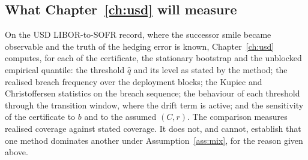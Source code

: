 
\subsection{What Chapter~\ref{ch:usd} will measure}

On the USD LIBOR-to-SOFR record, where the successor smile became observable and the truth of the hedging error is known, Chapter~\ref{ch:usd} computes, for each of the certificate, the stationary bootstrap and the unblocked empirical quantile: the threshold $\hat q$ and its level as stated by the method; the realised breach frequency over the deployment blocks; the Kupiec and Christoffersen statistics on the breach sequence; the behaviour of each threshold through the transition window, where the drift term is active; and the sensitivity of the certificate to $b$ and to the assumed $(C,r)$. The comparison measures realised coverage against stated coverage. It does not, and cannot, establish that one method dominates another under Assumption~\ref{ass:mix}, for the reason given above.
